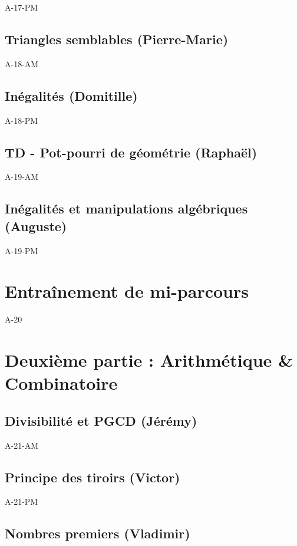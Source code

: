 \documentclass[poly,trombi]{valbonne}
\begin{document}
{A-17-PM}

\subsection{Triangles semblables (Pierre-Marie)}

{A-18-AM}

\subsection{Inégalités (Domitille)}

{A-18-PM}

\subsection{TD - Pot-pourri de géométrie (Raphaël)}

{A-19-AM}

\subsection{Inégalités et manipulations algébriques (Auguste)}

{A-19-PM}


\section{Entraînement de mi-parcours}

{A-20}


\section{Deuxième partie : Arithmétique \& Combinatoire}

\subsection{Divisibilité et PGCD (Jérémy)}

{A-21-AM}

\subsection{Principe des tiroirs (Victor)}

{A-21-PM}

\subsection{Nombres premiers (Vladimir)}
\end{document}
